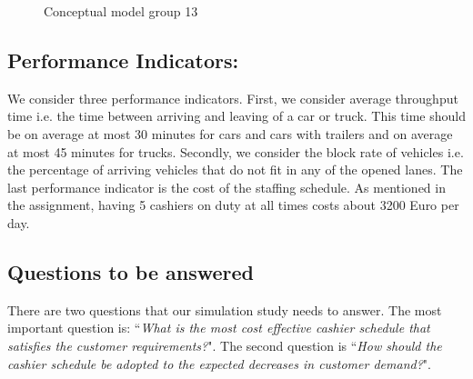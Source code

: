 \begin{figure}
\caption{Conceptual model group 13}
\label{fig:co-mod-grp-13}
\end{figure}

\subsection{Performance Indicators:}
We consider three performance indicators.
First, we consider average throughput time i.e. the time between arriving and leaving of a car or truck.
This time should be on average at most 30 minutes for cars and cars with trailers and on average at most 45 minutes for trucks.
Secondly, we consider the block rate of vehicles i.e. the percentage of arriving vehicles that do not fit in any of the opened lanes.
The last performance indicator is the cost of the staffing schedule.
As mentioned in the assignment, having 5 cashiers on duty at all times costs about 3200 Euro per day.


\subsection{Questions to be answered}
There are two questions that our simulation study needs to answer.
The most important question is: ``\textit{What is the most cost effective cashier schedule that satisfies the customer requirements?}".
The second question is ``\textit{How should the cashier schedule be adopted to the expected decreases in customer demand?}".

